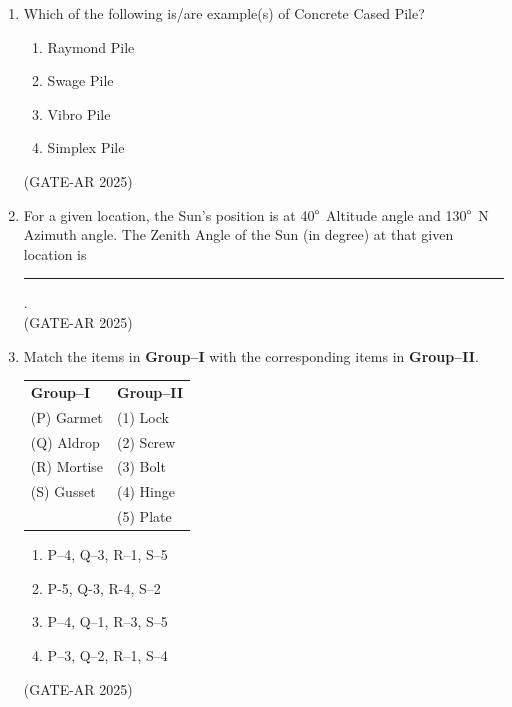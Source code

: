 \documentclass[a4paper,10pt]{article}
\begin{document}
\begin{enumerate}
\item Which of the following is/are example(s) of Concrete Cased Pile?
\begin{multicols}{2}
\begin{enumerate}
    \item Raymond Pile
    \item Swage Pile
    \item Vibro Pile
    \item Simplex Pile
\end{enumerate}
\end{multicols}
\hfill (GATE-AR 2025)

\item For a given location, the Sun's position is at 40$\degree$ Altitude angle and 130$\degree$ N Azimuth angle. The Zenith Angle of the Sun (in degree) at that given location is \rule{2cm}{0.4pt}. \\
\hfill (GATE-AR 2025)

\item Match the items in \textbf{Group–I} with the corresponding items in \textbf{Group–II}. \\
\begin{tabular}{ l l }
\textbf{Group–I} & \textbf{Group–II} \\
(P) Garmet & (1) Lock \\
(Q) Aldrop & (2) Screw \\
(R) Mortise & (3) Bolt \\
(S) Gusset & (4) Hinge \\
& (5) Plate \\
\end{tabular}
\begin{multicols}{2}
\begin{enumerate}
    \item P–4, Q–3, R–1, S–5
    \item P-5, Q-3, R-4, S–2
    \item P–4, Q–1, R–3, S–5
    \item P–3, Q–2, R–1, S–4
\end{enumerate}
\end{multicols}
\hfill (GATE-AR 2025)


\end{enumerate}
\end{document}
